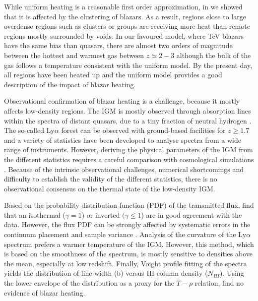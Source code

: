\documentclass[numberedappendix]{emulateapj}
\begin{document}
While uniform heating is a reasonable first order approximation, in \citet[hereafter Paper~I]{2015ApJ...811...19L} we showed that it is affected by the clustering of blazars. As a result, regions close to large overdense regions such as clusters or groups are receiving more heat than remote regions mostly surrounded by voids.  In our favoured model, where TeV blazars have the same bias than quasars, there are almost two orders of magnitude between the hottest and warmest gas between $z\simeq 2-3$ although the bulk of the gas follows a temperature consistent with the uniform model. By the present day, all regions have been heated up and the uniform model provides a good description of the impact of blazar heating.


Observational confirmation of blazar heating is a challenge, because it mostly affects low-density regions. The IGM is mostly observed through absorption lines within the spectra of distant quasars,  due to a tiny fraction of neutral hydrogen \citep{1971ApJ...164L..73L}. The so-called Ly$\alpha$ forest can be observed with ground-based facilities for $z\geq 1.7$ and a variety of statistics have been developed to analyse spectra from a wide range of instruments. However, deriving the physical parameters of the IGM from the different statistics requires a careful comparison with cosmological simulations \citep[see e.g.][]{1997ApJ...489....7R,2000MNRAS.318..817S,2013MNRAS.436.1023B,2017MNRAS.464..897B}. Because of the intrinsic observational challenges, numerical shortcomings and difficulty to establish the validity of the different statistics,  there is no observational consensus on the thermal state of the low-density IGM.

Based on the probability distribution function (PDF) of the transmitted flux, \citet{2007MNRAS.382.1657K,2008MNRAS.386.1131B,2009MNRAS.399L..39V,2012MNRAS.422.3019C} find that an isothermal ($\gamma=1$) or inverted $(\gamma\leq 1$) are in good agreement with the data. However, the flux PDF can be strongly affected by systematic errors in the continuum placement \citep{2012ApJ...753..136L} and sample variance \citep{2013MNRAS.428..540R}. Analysis of the curvature of the Ly$\alpha$ spectrum \citep{2011MNRAS.410.1096B,2014MNRAS.441.1916B} prefers a warmer temperature of the IGM. However, this method, which is based on the smoothness of the spectrum, is mostly sensitive to densities above the mean, especially at low redshift. Finally, Voight profile fitting of the spectra yields the distribution of line-width (b) versus HI column density ($N_{HI}$). Using the lower envelope of the distribution as a proxy for the $T-\rho$ relation, \citet{2012ApJ...757L..30R,2014MNRAS.438.2499B} find no evidence of blazar heating.
\end{document}
